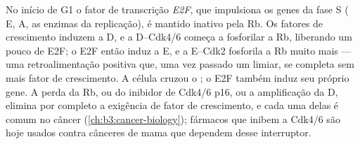 \begin{proposition}\label{prop:b3:cell-cycle-apoptosis:rb}
No início de G1 o fator de transcrição \emph{E2F}, que impulsiona os
genes da fase S ( E,  A, as enzimas da replicação), é
mantido inativo pela \emph{} Rb. Os fatores
de crescimento induzem a  D, e a  D--Cdk4/6 começa a
fosforilar a Rb, liberando um pouco de E2F; o E2F então induz a 
E, e a  E--Cdk2 fosforila a Rb muito mais --- uma
retroalimentação positiva que, uma vez passado um limiar, se completa
sem mais fator de crescimento. A célula cruzou o ; o
E2F também induz seu próprio gene. A perda da Rb, ou do inibidor de
Cdk4/6 p16, ou a amplificação da  D, elimina por completo a
exigência de fator de crescimento, e cada uma delas é comum no câncer
(\cref{ch:b3:cancer-biology}); fármacos que inibem a Cdk4/6 são hoje
usados contra cânceres de mama que dependem desse interruptor.
\end{proposition}


